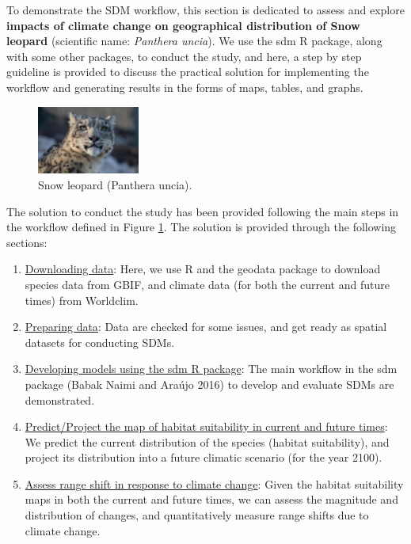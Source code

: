 \documentclass[
]{article}
\begin{document}
To demonstrate the SDM workflow, this section is dedicated to assess and
explore
\textbf{impacts of climate change on geographical distribution of Snow leopard}
(scientific name: \textit{Panthera uncia}). We use the sdm R package,
along with some other packages, to conduct the study, and here, a step
by step guideline is provided to discuss the practical solution for
implementing the workflow and generating results in the forms of maps,
tables, and graphs.

\begin{figure}[H]
    \centering
    \includegraphics[width=0.3\textwidth]{snow-leopard-picture.jpg}
    \caption{Snow leopard (Panthera uncia).}
    \label{fig:Fig1}
\end{figure}

The solution to conduct the study has been provided following the main
steps in the workflow defined in Figure \ref{fig:Fig1}. The solution is
provided through the following sections:

\begin{enumerate}
\def\labelenumi{(\roman{enumi})}
\item
  \uline{Downloading data}: Here, we use R and the geodata package to
  download species data from GBIF, and climate data (for both the
  current and future times) from Worldclim.
\item
  \uline{Preparing data}: Data are checked for some issues, and get
  ready as spatial datasets for conducting SDMs.
\item
  \uline{Developing models using the sdm R package}: The main workflow
  in the sdm package (Babak Naimi and Araújo 2016) to develop and
  evaluate SDMs are demonstrated.
\item
  \uline{Predict/Project the map of habitat suitability in current and future times}:
  We predict the current distribution of the species (habitat
  suitability), and project its distribution into a future climatic
  scenario (for the year 2100).
\item
  \uline{Assess range shift in response to climate change}: Given the
  habitat suitability maps in both the current and future times, we can
  assess the magnitude and distribution of changes, and quantitatively
  measure range shifts due to climate change.
\end{enumerate}
\end{document}
